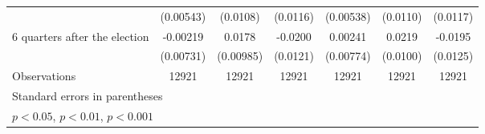 \begin{table}[htbp]
\begin{tabular}{l*{6}{c}}
                    &   (0.00543)         &    (0.0108)         &    (0.0116)         &   (0.00538)         &    (0.0110)         &    (0.0117)         \\
[1em]
 6 quarters after the election&    -0.00219         &      0.0178         &     -0.0200         &     0.00241         &      0.0219\sym{*}  &     -0.0195         \\
                    &   (0.00731)         &   (0.00985)         &    (0.0121)         &   (0.00774)         &    (0.0100)         &    (0.0125)         \\
\hline
Observations        &       12921         &       12921         &       12921         &       12921         &       12921         &       12921         \\
\hline\hline
\multicolumn{7}{l}{\footnotesize Standard errors in parentheses}\\
\multicolumn{7}{l}{\footnotesize \sym{*} \(p<0.05\), \sym{**} \(p<0.01\), \sym{***} \(p<0.001\)}\\
\end{tabular}
\end{table}

